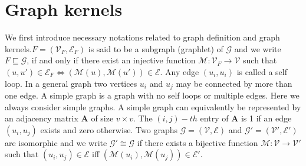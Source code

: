 \section{Graph kernels}
 We first introduce  necessary notations related to graph definition and graph kernels.\newline $F=(\mathcal{V}_F,\mathcal{E}_F)$ is said to be a subgraph (graphlet) of $\mathcal{G}$ and we write $F\sqsubseteq \mathcal{G}$, if and only if there exist an injective function $\mathcal{M}:\mathcal{V}_F\xrightarrow{} \mathcal{V}$ such that $(u,u')\in \mathcal{E}_F \Leftrightarrow{(\mathcal{M}(u),\mathcal{M}(u'))\in \mathcal{E}}$.\newline
Any edge $(u_i, u_i)$ is called a self loop. In a general graph two vertices $u_i$ and $u_j$ may be connected by more than
one edge. A simple graph is a graph with no self loops
or multiple edges. Here we always consider simple graphs.\newline
A simple graph can equivalently be represented by an adjacency matrix $\mathbf{A}$ of size $v \times v$. The $(i,j)-th$ entry of $\mathbf{A}$ is 1 if an edge $(u_i, u_j)$ exists and zero otherwise.\newline
Two graphs $\mathcal{G}=(\mathcal{V},\mathcal{E})$ and $\mathcal{G'}=(\mathcal{V'},\mathcal{E'})$ are isomorphic and we write $\mathcal{G}'\cong \mathcal{G}$ if there exists a bijective function $\mathcal{M}:\mathcal{V}\xrightarrow{} \mathcal{V}'$ such that $(u_i,u_j)\in \mathcal{E}$ iff $(\mathcal{M}(u_i),\mathcal{M}(u_j))\in \mathcal{E}'$.


